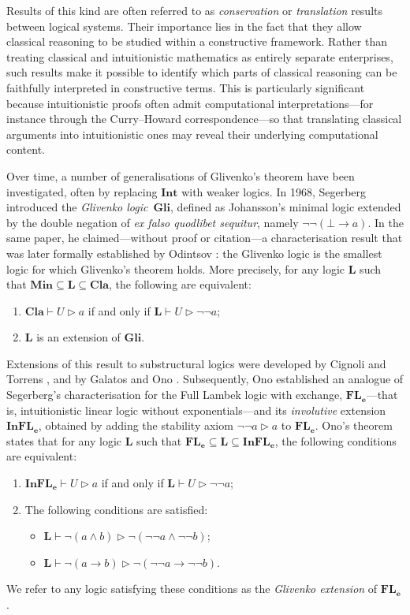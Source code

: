 \documentclass[runningheads]{llncs}
\renewcommand{\L}{\mathbf{L}}
\newcommand{\FLe}{\mathbf{FL_e}}
\newcommand{\InFLe}{\mathbf{InFL_e}}
\newcommand{\Min}{\mathbf{Min}}
\newcommand{\Cl}{\mathbf{Cla}}
\newcommand{\Gl}{\mathbf{Gli}}
\newcommand{\Int}{\mathbf{Int}}
\begin{document}
Results of this kind are often referred to as \emph{conservation} or \emph{translation} results between logical systems. Their importance lies in the fact that they allow classical reasoning to be studied within a constructive framework. Rather than treating classical and intuitionistic mathematics as entirely separate enterprises, such results make it possible to identify which parts of classical reasoning can be faithfully interpreted in constructive terms. This is particularly significant because intuitionistic proofs often admit computational interpretations---for instance through the Curry--Howard correspondence---so that translating classical arguments into intuitionistic ones may reveal their underlying computational content.

Over time, a number of generalisations of Glivenko's theorem have been investigated, often by replacing $\Int$ with weaker logics. In 1968, Segerberg \cite{Segerberg1968-SEGPLR} introduced the \emph{Glivenko logic}~$\Gl$, defined as Johansson's minimal logic extended by the double negation of \emph{ex falso quodlibet sequitur}, namely $\neg\neg(\bot \to a)$. In the same paper, he claimed---without proof or citation---a characterisation result that was later formally established by Odintsov \cite{Odintsov02,Odintsov2004-ODINEO-2}: the Glivenko logic is the smallest logic for which Glivenko's theorem holds. More precisely, for any logic $\L$ such that $\Min \subseteq \L \subseteq \Cl$, the following are equivalent:
\begin{enumerate}
    \item $\Cl \vdash U \rhd a$ if and only if $\L \vdash U \rhd \neg\neg a$;
    \item $\L$ is an extension of $\Gl$.
\end{enumerate}

Extensions of this result to substructural logics were developed by Cignoli and Torrens \cite{Cignoli2003-CIGHBF,CignoliTorrens}, and by Galatos and Ono \cite{GO:glitsl,ResLat}. Subsequently, Ono \cite{ono:gli} established an analogue of Segerberg's characterisation for the Full Lambek logic with exchange, $\FLe$---that is, intuitionistic linear logic without exponentials---and its \emph{involutive} extension $\InFLe$, obtained by adding the stability axiom $\neg\neg a \rhd a$ to $\FLe$. Ono's theorem states that for any logic $\L$ such that $\FLe \subseteq \L \subseteq \InFLe$, the following conditions are equivalent:
\begin{enumerate}
    \item $\InFLe \vdash U \rhd a$ if and only if $\L \vdash U \rhd \neg\neg a$;
    \item The following conditions are satisfied:
    \begin{itemize}
        \item $\L \vdash \neg(a \wedge b) \rhd \neg(\neg\neg a \wedge \neg\neg b)$;
        \item $\L \vdash \neg(a \to b) \rhd \neg(\neg\neg a \to \neg\neg b)$.
    \end{itemize}
\end{enumerate}
We refer to any logic satisfying these conditions as the \emph{Glivenko extension} of $\FLe$.
\end{document}
